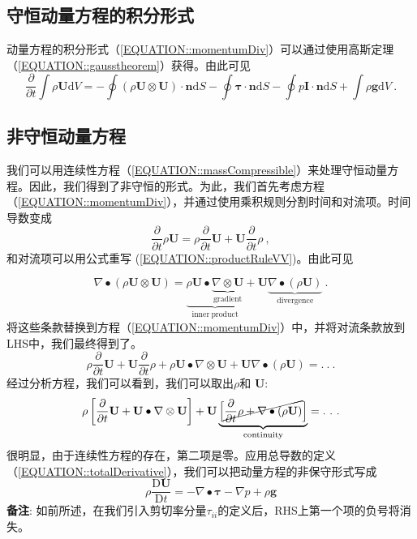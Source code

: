 \documentclass[MathematicsNumericsDerivationsAndOpenFOAM.tex]{subfiles}
\begin{document}
\subsection{守恒动量方程的积分形式}
%
%
   动量方程的积分形式（\ref{EQUATION::momentumDiv}）可以通过使用高斯定理（\ref{EQUATION::gausstheorem}）获得。由此可见
%
%
%
\begin{equation}
 \boxed{
    \frac{\partial}{\partial t} \int \rho \textbf{U} \mathrm{d}V
=
    -   \oint (\rho\textbf{U} \otimes \textbf{U}) \cdot \textbf{n} \mathrm{d}S
    -   \oint \boldsymbol \tau  \cdot \textbf{n} \mathrm{d}S
    -   \oint p\textbf{I} \cdot \textbf{n} \mathrm{d}S
    + \int \rho\textbf{g}  \mathrm{d}V
 } ~.
\end{equation}
%
%
%
\subsection{非守恒动量方程}
%
%
    我们可以用连续性方程（\ref{EQUATION::massCompressible}）来处理守恒动量方程。因此，我们得到了非守恒的形式。为此，我们首先考虑方程（\ref{EQUATION::momentumDiv}），并通过使用乘积规则分割时间和对流项。时间导数变成
%
%
\begin{equation}
  \frac{\partial}{\partial t} \rho \textbf{U}
=
  \rho \frac{\partial}{\partial t} \textbf{U} + \textbf{U} \frac{\partial}{\partial t} \rho ~,
\end{equation}
%
%
  和对流项可以用公式重写 (\ref{EQUATION::productRuleVV})。由此可见

%
%
\begin{equation}
  \nabla \bullet \left(\rho\textbf{U} \otimes \textbf{U}\right)
=
  \underbrace{\rho\textbf{U} \bullet \underbrace{\nabla \otimes \textbf{U}}_{\mathrm{gradient}}}_{\mathrm{inner~product}} + \textbf{U} \underbrace{\nabla \bullet (\rho\textbf{U})}_{\mathrm{divergence}} ~.
\end{equation}
%
%
    将这些条款替换到方程（\ref{EQUATION::momentumDiv}）中，并将对流条款放到LHS中，我们最终得到了。
%
%
\begin{equation}
   \rho \frac{\partial}{\partial t} \textbf{U} + \textbf{U} \frac{\partial}{\partial t} \rho
+
   \rho\textbf{U} \bullet \nabla \otimes \textbf{U} + \textbf{U} \nabla \bullet (\rho\textbf{U})
=
   .~.~.
\end{equation}
%
%
    经过分析方程，我们可以看到，我们可以取出$\rho$和    $\textbf{U}$:
%
%
\begin{equation}
   \rho \left[\frac{\partial}{\partial t} \textbf{U} + \textbf{U} \bullet \nabla \otimes \textbf{U}\right]
+
\textbf{U} \underbrace{\left[\cancel{\frac{\partial}{\partial t} \rho + \nabla \bullet (\rho\textbf{U})}\right]}_{\mathrm{continuity}}
=
   .~.~.
\end{equation}
%
%
    很明显，由于连续性方程的存在，第二项是零。应用总导数的定义（\ref{EQUATION::totalDerivative}），我们可以把动量方程的非保守形式写成
%
%
\begin{equation}
  \rho \frac{\mathrm{D}\textbf{U}}{\mathrm{D}t}
=
    -   \nabla \bullet \boldsymbol \tau
    -   \nabla p
    + \rho\textbf{g}
\label{EQUATION::momentumDivNon}
\end{equation}
%
%
    \textbf{备注}: 如前所述，在我们引入剪切率分量$\tau_{ii}$的定义后，RHS上第一个项的负号将消失。
%
%
%
%
%

\end{document}
